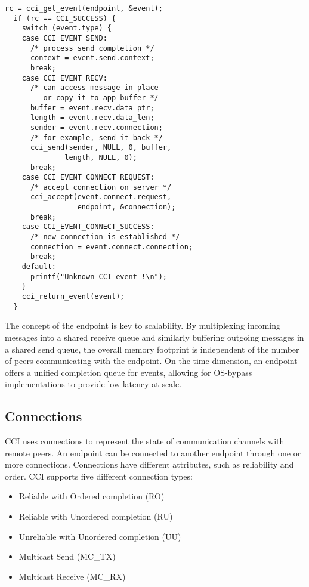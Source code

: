 \lstset{language=C, frame=single, basicstyle=\ttfamily\small}
\begin{lstlisting}[float]
  rc = cci_get_event(endpoint, &event);
  if (rc == CCI_SUCCESS) {
    switch (event.type) {
    case CCI_EVENT_SEND:
      /* process send completion */
      context = event.send.context;
      break;
    case CCI_EVENT_RECV:
      /* can access message in place 
         or copy it to app buffer */
      buffer = event.recv.data_ptr;
      length = event.recv.data_len;
      sender = event.recv.connection;
      /* for example, send it back */
      cci_send(sender, NULL, 0, buffer, 
              length, NULL, 0);
      break;
    case CCI_EVENT_CONNECT_REQUEST:
      /* accept connection on server */
      cci_accept(event.connect.request, 
                 endpoint, &connection);
      break;
    case CCI_EVENT_CONNECT_SUCCESS:
      /* new connection is established */
      connection = event.connect.connection;
      break;
    default:
      printf("Unknown CCI event !\n");
    }
    cci_return_event(event);
  }
\end{lstlisting}

The concept of the endpoint is key to scalability. By multiplexing incoming 
messages into a shared receive queue and similarly buffering outgoing 
messages in a shared send queue, the overall memory footprint is independent 
of the number of peers communicating with the endpoint. On the time dimension, 
an endpoint offers a unified completion queue for events, allowing for 
OS-bypass implementations to provide low latency at scale. 



\subsection{Connections}
CCI uses connections to represent the state of communication channels with 
remote peers. An endpoint can be connected to another endpoint through one or 
more connections. Connections have different attributes, such as 
reliability and order. CCI supports five different connection types:

\begin{itemize}
\item Reliable with Ordered completion (RO)
\item Reliable with Unordered completion (RU)
\item Unreliable with Unordered completion (UU)
\item Multicast Send (MC\_TX)
\item Multicast Receive (MC\_RX)
\end{itemize}

